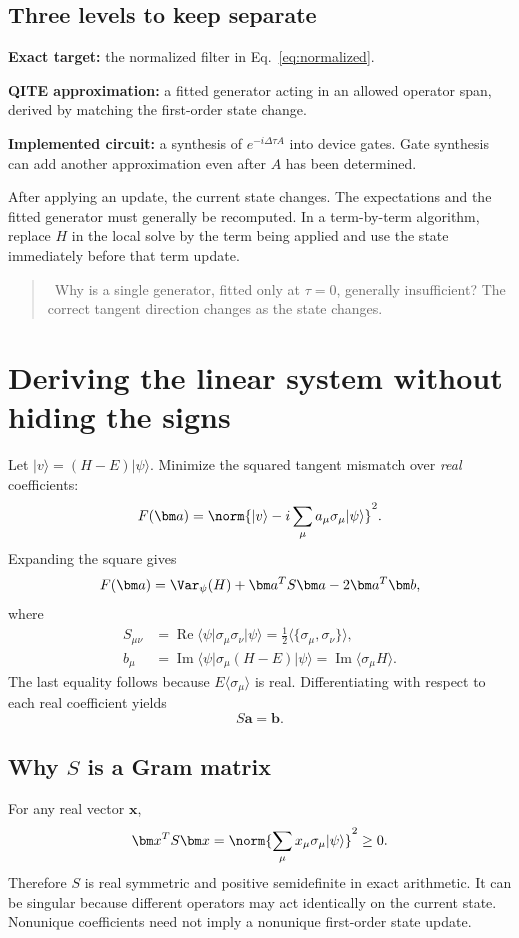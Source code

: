 \documentclass[11pt,a4paper]{article}
\newcommand{\ket}[1]{\lvert #1\rangle}
\newcommand{\bra}[1]{\langle #1\rvert}
\newcommand{\ex}[1]{\langle #1\rangle}
\newcommand{\Rea}{\operatorname{Re}}
\newcommand{\Ima}{\operatorname{Im}}
\newcommand{\dt}{\Delta\tau}
\newcommand{\lesson}[2]{\clearpage\section{#1}\label{#2}}
\newenvironment{idea}[1][Main idea]{\par\smallskip\begin{quotation}\noindent{\bfseries\textcolor{keyblue}{#1.}}\ }{\end{quotation}\smallskip}
\newcommand{\checkpoint}[1]{\begin{idea}[Pause and check]#1\end{idea}}
\begin{document}
\subsection*{Three levels to keep separate}
\textbf{Exact target:} the normalized filter in Eq.~\eqref{eq:normalized}.

\textbf{QITE approximation:} a fitted generator acting in an allowed operator span, derived by matching the first-order state change.

\textbf{Implemented circuit:} a synthesis of $e^{-i\dt A}$ into device gates. Gate synthesis can add another approximation even after $A$ has been determined.

After applying an update, the current state changes. The expectations and the fitted generator must generally be recomputed. In a term-by-term algorithm, replace $H$ in the local solve by the term being applied and use the state immediately before that term update.

\checkpoint{Why is a single generator, fitted only at $\tau=0$, generally insufficient? The correct tangent direction changes as the state changes.}

\lesson{Deriving the linear system without hiding the signs}{sec:linear}
Let $\ket{v}=(H-E)\ket{\psi}$. Minimize the squared tangent mismatch over \emph{real} coefficients:
\[
F(\bm a)=\norm{\ket{v}-i\sum_\mu a_\mu\sigma_\mu\ket{\psi}}^2.
\]
Expanding the square gives
\[
F(\bm a)=\Var_\psi(H)+\bm a^T S\bm a-2\bm a^T\bm b,
\]
where
\begin{align}
S_{\mu\nu}&=\Rea\bra{\psi}\sigma_\mu\sigma_\nu\ket{\psi}
=\tfrac12\ex{\{\sigma_\mu,\sigma_\nu\}},\label{eq:S}\\
b_\mu&=\Ima\bra{\psi}\sigma_\mu(H-E)\ket{\psi}
=\Ima\ex{\sigma_\mu H}.\label{eq:b}
\end{align}
The last equality follows because $E\ex{\sigma_\mu}$ is real. Differentiating with respect to each real coefficient yields
\begin{equation}
\boxed{S\bm a=\bm b.}
\label{eq:solve}
\end{equation}

\subsection*{Why $S$ is a Gram matrix}
For any real vector $\bm x$,
\[
\bm x^T S\bm x=\norm{\sum_\mu x_\mu\sigma_\mu\ket{\psi}}^2\ge0.
\]
Therefore $S$ is real symmetric and positive semidefinite in exact arithmetic. It can be singular because different operators may act identically on the current state. Nonunique coefficients need not imply a nonunique first-order state update.
\end{document}

